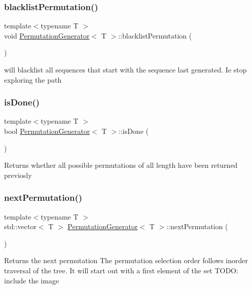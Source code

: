 \subsubsection{\texorpdfstring{blacklist\+Permutation()}{blacklistPermutation()}}
{\footnotesize\ttfamily template$<$typename T $>$ \\
void \hyperlink{classPermutationGenerator}{Permutation\+Generator}$<$ T $>$\+::blacklist\+Permutation (\begin{DoxyParamCaption}{ }\end{DoxyParamCaption})}

will blacklist all sequences that start with the sequence last generated. Ie stop exploring the path \mbox{\label{classPermutationGenerator_a4bee28112c8dece4337c9d65949216c6}} 
\subsubsection{\texorpdfstring{is\+Done()}{isDone()}}
{\footnotesize\ttfamily template$<$typename T $>$ \\
bool \hyperlink{classPermutationGenerator}{Permutation\+Generator}$<$ T $>$\+::is\+Done (\begin{DoxyParamCaption}{ }\end{DoxyParamCaption})}

\begin{DoxyReturn}{Returns}
whether all possible permutations of all length have been returned previosly 
\end{DoxyReturn}
\mbox{\label{classPermutationGenerator_a504d17b77c3289e19e95f2b60e8db24d}} 
\subsubsection{\texorpdfstring{next\+Permutation()}{nextPermutation()}}
{\footnotesize\ttfamily template$<$typename T $>$ \\
std\+::vector$<$ T $>$ \hyperlink{classPermutationGenerator}{Permutation\+Generator}$<$ T $>$\+::next\+Permutation (\begin{DoxyParamCaption}{ }\end{DoxyParamCaption})}

\begin{DoxyReturn}{Returns}
the next permutation The permutation selection order follows inorder traversal of the tree. It will start out with a first element of the set T\+O\+DO\+: include the image 
\end{DoxyReturn}
